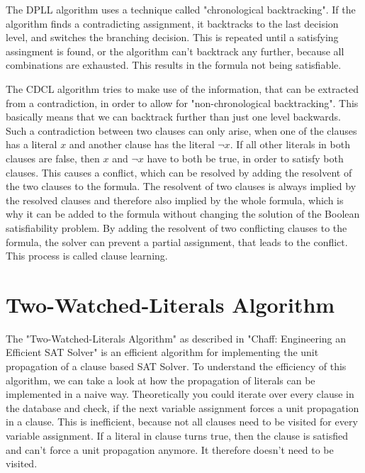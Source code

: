 The DPLL algorithm uses a technique called "chronological backtracking". If the algorithm finds a contradicting assignment, it backtracks to the last decision level, and switches the branching decision. This is repeated until a satisfying assingment is found, or the algorithm can't backtrack any further, because all combinations are exhausted. This results in the formula not being satisfiable. \cite{biere2009handbook}

The CDCL algorithm tries to make use of the information, that can be extracted from a contradiction, in order to allow for "non-chronological backtracking". This basically means that we can backtrack further than just one level backwards. \cite{biere2009handbook}
Such a contradiction between two clauses can only arise, when one of the clauses has a literal $x$ and another clause has the literal $\neg x$. If all other literals in both clauses are false, then $x$ and $\neg x$ have to both be true, in order to satisfy both clauses. This causes a conflict, which can be resolved by adding the resolvent of the two clauses to the formula. The resolvent of two clauses is always implied by the resolved clauses and therefore also implied by the whole formula, which is why it can be added to the formula without changing the solution of the Boolean satisfiability problem. By adding the resolvent of two conflicting clauses to the formula, the solver can prevent a partial assignment, that leads to the conflict. This process is called clause learning. \cite{biere2009handbook}

\section{Two-Watched-Literals Algorithm}
\label{sec:twoWatchedLiterals}

The "Two-Watched-Literals Algorithm" as described in "Chaff: Engineering an Efficient SAT Solver" \cite{moskewicz2001chaff} is an efficient algorithm for implementing the unit propagation of a clause based SAT Solver. To understand the efficiency of this algorithm, we can take a look at how the propagation of literals can be implemented in a naive way. Theoretically you could iterate over every clause in the database and check, if the next variable assignment forces a unit propagation in a clause. This is inefficient, because not all clauses need to be visited for every variable assignment. If a literal in clause turns true, then the clause is satisfied and can't force a unit propagation anymore. It therefore doesn't need to be visited.

